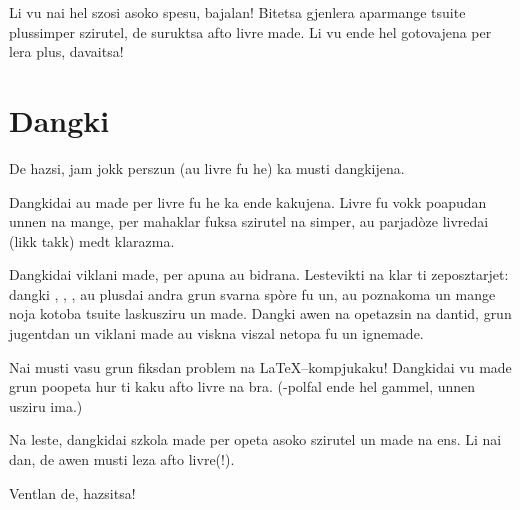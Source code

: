 Li vu nai hel szosi asoko spesu, bajalan! Bitetsa gjenlera aparmange tsuite
plussimper szirutel, de suruktsa afto livre made. Li vu ende hel gotovajena
per lera plus, davaitsa!


\section{Dangki}
De hazsi, jam jokk perszun (au livre fu he) ka musti dangkijena.

Dangkidai  au  made per livre fu he
ka ende kakujena. Livre fu vokk poapudan unnen na mange, per mahaklar
fuksa szirutel na simper, au parjadòze livredai (likk takk) medt klarazma.

Dangkidai  viklani made, per apuna au bidrana. Lestevikti na
klar ti  zeposztarjet: dangki , ,
, au plusdai andra grun svarna spòre fu un, au poznakoma un
mange noja kotoba tsuite laskusziru un made. Dangki awen na  opetazsin na
dantid, grun jugentdan un viklani made au viskna viszal netopa fu un ignemade.

Nai musti vasu  grun fiksdan problem na \LaTeX--kompjukaku! Dangkidai
vu made grun poopeta hur ti kaku afto livre na bra. (-polfal ende
hel gammel, unnen usziru ima.)

Na leste, dangkidai szkola made per opeta asoko szirutel un made na ens. Li nai dan,
de awen musti leza afto livre(!).

\begin{center}
  Ventlan de, hazsitsa!
\end{center}
